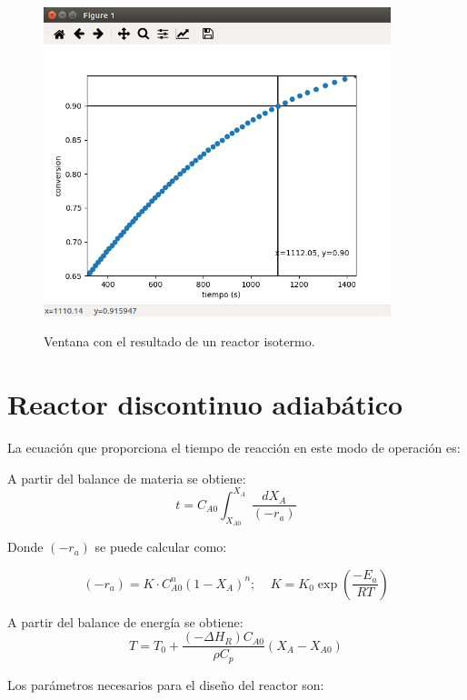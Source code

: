 	\begin{figure}[!h]
		\centering
		\includegraphics[width=0.9\textwidth]{./imagenes/reactor_discontinuo/iso_fig.png}
		\label{dis_iso_graf}
		\caption{Ventana con el resultado de un reactor isotermo.}
	\end{figure}
	
	\section{Reactor discontinuo adiabático}
	La ecuación que proporciona el tiempo de reacción en este modo de operación es:
	
	A partir del balance de materia se obtiene:
	\begin{equation*}
	t = C_{A0}\int_{X_{A0}}^{X_A}\frac{dX_A}{(-r_a)}
	\end{equation*}
	
	Donde $(-r_a)$ se puede calcular como:
	
	\begin{equation*}
	(-r_a) = K \cdot C_{A0}^n (1-X_A)^n; ~~~~~ K = K_0\exp\left(\frac{-E_a}{RT}\right)
	\end{equation*}
	
	A partir del balance de energía se obtiene:
	\begin{equation*}
	T = T_0 + \frac{(-\Delta H_R)C_{A0}}{\rho C_p}(X_A-X_{A0})
	\end{equation*}
	
	Los parámetros necesarios para el diseño del reactor son:
	
